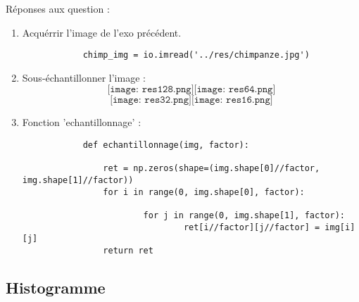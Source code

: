 \documentclass[12pt]{article}
\begin{document}
Réponses aux question :
\begin{enumerate}

	\item 
		Acquérrir l'image de l'exo précédent.
		\begin{verbatim}
			chimp_img = io.imread('../res/chimpanze.jpg')
		\end{verbatim}
		
	\item
		Sous-échantillonner l'image : \\
		$$
			\texttt{[image: res128.png]}
			\texttt{[image: res64.png]}
		$$
		$$
			\texttt{[image: res32.png]}
			\texttt{[image: res16.png]}
		$$
		
	\item
		Fonction 'echantillonnage' : 
		\begin{verbatim}
			def echantillonnage(img, factor):
    
				ret = np.zeros(shape=(img.shape[0]//factor, img.shape[1]//factor))
				for i in range(0, img.shape[0], factor):
						
						for j in range(0, img.shape[1], factor):
								ret[i//factor][j//factor] = img[i][j]
				return ret
		\end{verbatim}
		
\end{enumerate}

\subsection{Histogramme}
	
\end{document}
